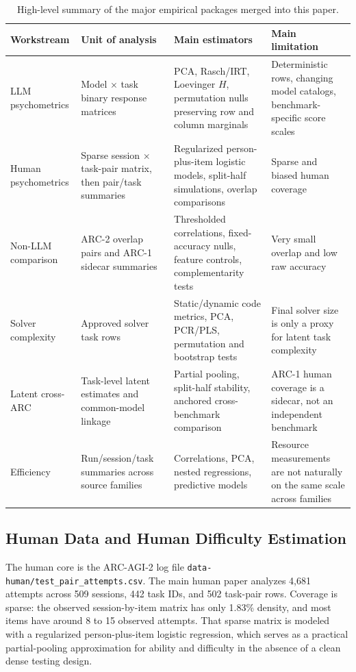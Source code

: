 \documentclass[11pt,letterpaper]{article}
\begin{document}
\begin{table}[t]
\centering
\small
\begin{tabularx}{\textwidth}{>{\raggedright\arraybackslash}p{2.7cm} >{\raggedright\arraybackslash}p{2.8cm} >{\raggedright\arraybackslash}X >{\raggedright\arraybackslash}p{3.1cm}}
\toprule
Workstream & Unit of analysis & Main estimators & Main limitation \\
\midrule
LLM psychometrics & Model $\times$ task binary response matrices & PCA, Rasch/IRT, Loevinger $H$, permutation nulls preserving row and column marginals & Deterministic rows, changing model catalogs, benchmark-specific score scales \\
Human psychometrics & Sparse session $\times$ task-pair matrix, then pair/task summaries & Regularized person-plus-item logistic models, split-half simulations, overlap comparisons & Sparse and biased human coverage \\
Non-LLM comparison & ARC-2 overlap pairs and ARC-1 sidecar summaries & Thresholded correlations, fixed-accuracy nulls, feature controls, complementarity tests & Very small overlap and low raw accuracy \\
Solver complexity & Approved solver task rows & Static/dynamic code metrics, PCA, PCR/PLS, permutation and bootstrap tests & Final solver size is only a proxy for latent task complexity \\
Latent cross-ARC & Task-level latent estimates and common-model linkage & Partial pooling, split-half stability, anchored cross-benchmark comparison & ARC-1 human coverage is a sidecar, not an independent benchmark \\
Efficiency & Run/session/task summaries across source families & Correlations, PCA, nested regressions, predictive models & Resource measurements are not naturally on the same scale across families \\
\bottomrule
\end{tabularx}
\caption{High-level summary of the major empirical packages merged into this paper.}
\label{tab:workstreams}
\end{table}

\subsection{Human Data and Human Difficulty Estimation}

The human core is the ARC-AGI-2 log file \texttt{data-human/test\_pair\_attempts.csv}. The main human paper analyzes 4,681 attempts across 509 sessions, 442 task IDs, and 502 task-pair rows. Coverage is sparse: the observed session-by-item matrix has only 1.83\% density, and most items have around 8 to 15 observed attempts. That sparse matrix is modeled with a regularized person-plus-item logistic regression, which serves as a practical partial-pooling approximation for ability and difficulty in the absence of a clean dense testing design.
\end{document}
